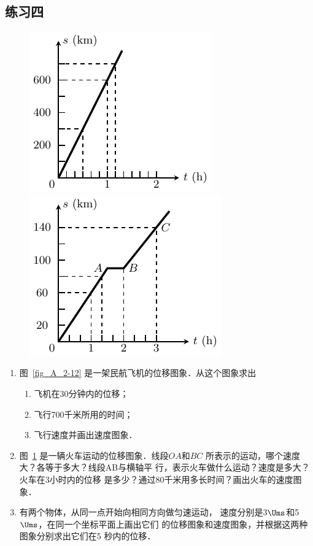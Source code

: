 \subsection*{练习四}
\begin{figure}[htp]
    \centering
    \begin{minipage}[t]{0.48\textwidth}
        \centering
        \includegraphics{fig/A/2-12.pdf}
        \caption{}\label{fig_A_2-12}
    \end{minipage}
    \begin{minipage}[t]{0.48\textwidth}
        \centering
        \includegraphics{fig/A/2-13.pdf}
        \caption{}\label{fig_A_2-13}
    \end{minipage}
\end{figure}

\begin{enumerate}
\item 
图~\ref{fig_A_2-12} 是一架民航飞机的位移图象．从这个图象求出
\begin{enumerate}
    \item 飞机在30分钟内的位移；
    \item 飞行700千米所用的时间；
    \item 飞行速度并画出速度图象．
\end{enumerate}

\item  
图~\ref{fig_A_2-13} 是一辆火车运动的位移图象．线段$OA$和$BC$
所表示的运动，哪个速度大？各等于多大？线段AB与横轴平
行，表示火车做什么运动？速度是多大？火车在3小时内的位移
是多少？通过80千米用多长时间？画出火车的速度图象．


\item  
有两个物体，从同一点开始向相同方向做匀速运动，
速度分别是3$\Ums$和5$\Ums$，在同一个坐标平面上画出它们
的位移图象和速度图象，并根据这两种图象分别求出它们在5
秒内的位移．

\end{enumerate}


